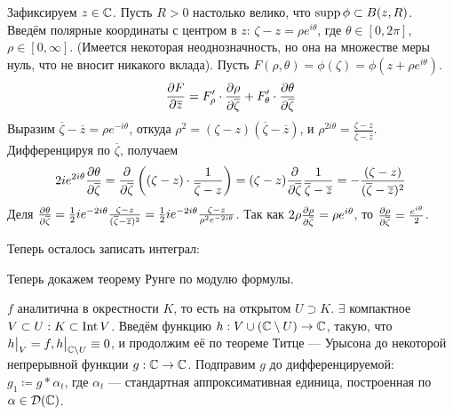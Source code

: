 \documentclass[a4paper]{report}
\begin{document}
{{{            Зафиксируем $z \in \mathbb{C}$.
            Пусть $R > 0$ настолько велико, что $\operatorname{supp} \phi \subset B(z, R)$.
            Введём полярные координаты с центром в $z$: $\zeta - z = \rho e^{i\theta}$, где $\theta \in [0, 2\pi]$, $\rho \in [0, \infty]$.
            (Имеется некоторая неоднозначность, но она на множестве меры нуль, что не вносит никакого вклада).
        Пусть $F(\rho, \theta) = \phi(\zeta) = \phi(z + \rho e^{i\theta})$.
        \[\frac{\partial F}{\partial \overline{z}} = F'_\rho \cdot \frac{\partial \rho}{\partial \overline{\zeta}} + F'_\theta \cdot \frac{\partial \theta}{\partial \overline{\zeta}}\]
        Выразим $\overline{\zeta} - \overline{z} = \rho e^{-i\theta}$, откуда $\rho^2 = (\zeta - z)(\overline{\zeta} - \overline{z})$, и $\rho^{2i\theta} = \frac{\zeta - z}{\overline{\zeta} - \overline{z}}$.
        Дифференцируя по $\overline{\zeta}$, получаем \[2i e^{2i\theta}\frac{\partial \theta}{\partial \overline{\zeta}} = \frac{\partial }{\partial \overline{\zeta}}\left((\zeta - z) \cdot \frac{1}{\overline{\zeta} - z}\right) = (\zeta - z)\frac{\partial }{\partial \overline{\zeta}}\frac{1}{\overline{\zeta} - \overline{z}} = -\frac{(\zeta - z)}{(\overline{\zeta} - \overline{z})^2}\]
        Деля $\frac{\partial \theta}{\partial \overline{\zeta}} = \frac{1}{2}i e^{-2i\theta} \frac{\zeta - z}{(\overline{\zeta} - \overline{z})^2} = \frac{1}{2}i e^{-2i \theta} \frac{\zeta - z}{\rho^2 e^{-2i \theta}}$.
        Так как $2\rho \frac{\partial \rho}{\partial \overline{\zeta}} = \rho e^{i\theta}$, то $\frac{\partial \rho}{\partial \overline{\zeta}} = \frac{e^{i\theta}}{2}$.

        Теперь осталось записать интеграл:

        }


    Теперь докажем теорему Рунге по модулю формулы.

    $f$ аналитична в окрестности $K$, то есть на открытом $U \supset K$.
    $\exists$ компактное $V \subset U: K \subset \operatorname{Int} V$.
    Введём функцию $h: V \cup (\mathbb{C} \setminus U) \rightarrow \mathbb{C}$, такую, что $h\big|_{V} = f, h\big|_{\mathbb{C} \setminus U} \equiv 0$, и продолжим её по теореме Титце --- Урысона до некоторой непрерывной функции $g: \mathbb{C} \rightarrow \mathbb{C}$.
    Подправим $g$ до дифференцируемой: $g_1 \coloneqq g * \alpha_t$, где $\alpha_t$ --- стандартная аппроксимативная единица, построенная по $\alpha \in \mathcal{D}(\mathbb{C})$.

}}
\end{document}
